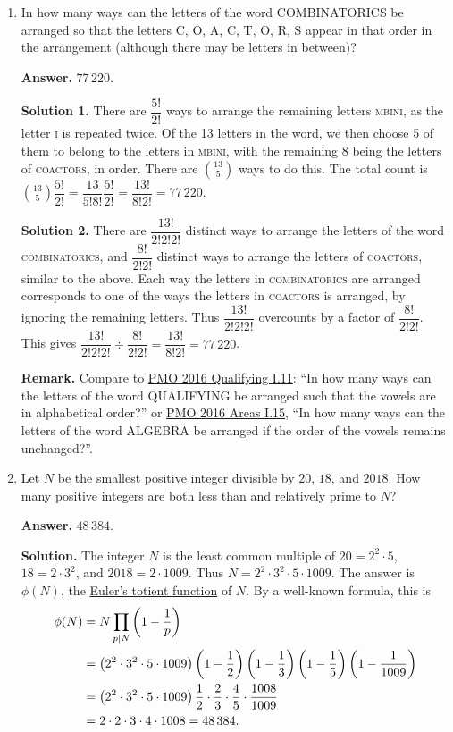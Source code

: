 \documentclass[11pt,paper=letter]{scrartcl}
\begin{document}
\begin{enumerate}[left=0pt]
\item In how many ways can the letters of the word COMBINATORICS be arranged so that the letters C, O, A, C, T, O, R, S appear in that order in the arrangement (although there may be letters in between)?

{\sffamily \bfseries Answer.} $\boxed{77\,220}$.

{\sffamily \bfseries Solution 1.} There are $\dfrac{5!}{2!}$ ways to arrange the remaining letters \textsc{mbini}, as the letter \textsc{i} is repeated twice. Of the 13 letters in the word, we then choose 5 of them to belong to the letters in \textsc{mbini}, with the remaining 8 being the letters of \textsc{coactors}, in order. There are $\displaystyle\binom{13}{5}$ ways to do this. The total count is $\displaystyle \binom{13}{5}\dfrac{5!}{2!} = \dfrac{13}{5!8!}\dfrac{5!}{2!} = \dfrac{13!}{8!2!} = 77\,220$.

{\sffamily \bfseries Solution 2.} There are $\dfrac{13!}{2!2!2!}$ distinct ways to arrange the letters of the word \textsc{combinatorics}, and $\dfrac{8!}{2!2!}$ distinct ways to arrange the letters of \textsc{coactors}, similar to the above. Each way the letters in \textsc{combinatorics} are arranged corresponds to one of the ways the letters in \textsc{coactors} is arranged, by ignoring the remaining letters. Thus $\dfrac{13!}{2!2!2!}$ overcounts by a factor of $\dfrac{8!}{2!2!}$. This gives ${\dfrac{13!}{2!2!2!}} \div {\dfrac{8!}{2!2!}} = \dfrac{13!}{8!2!} = 77\,220$.

{\small \sffamily \textbf{Remark.} Compare to \href{http://pmo.ph/wp-content/uploads/2015/10/18thPMO-QualifyingRound-Questions.pdf}{PMO 2016 Qualifying I.11}: ``In how many ways can the letters of the word QUALIFYING be arranged such that the vowels are in alphabetical order?'' or \href{http://pmo.ph/wp-content/uploads/2014/08/18th-PMO-Area-Stage.pdf}{PMO 2016 Areas I.15,} ``In how many ways can the letters of the word ALGEBRA be arranged if the order of the vowels remains unchanged?''.}

\item Let $N$ be the smallest positive integer divisible by $20$, $18$, and $2018$. How many positive integers are both less than and relatively prime to $N$?

{\sffamily \bfseries Answer.} $\boxed{48\,384}$.

{\sffamily \bfseries Solution.} The integer $N$ is the least common multiple of $20 = 2^2 \cdot 5$, $18 = 2 \cdot 3^2$, and $2018 = 2 \cdot 1009$. Thus $N = 2^2 \cdot 3^2 \cdot 5 \cdot 1009$. The answer is $\phi(N)$, the \href{https://en.wikipedia.org/wiki/Euler%27s_totient_function}{Euler's totient function} of $N$. By a well-known formula, this is \begin{align*}
\phi(N) &= N\prod_{p|N}\left( 1 - \frac1p \right) \\
&= \left( 2^2 \cdot 3^2 \cdot 5 \cdot 1009 \right)\left( 1 - \dfrac12 \right)\left( 1 - \frac13 \right)\left( 1 - \frac15 \right)\left( 1 - \frac1{1009} \right) \\
&= \left( 2^2 \cdot 3^2 \cdot 5 \cdot 1009 \right)\dfrac12 \cdot \dfrac23 \cdot \dfrac45 \cdot \dfrac{1008}{1009} \\
&= 2 \cdot 2 \cdot 3 \cdot 4 \cdot 1008 = 48\,384.\end{align*}


\end{enumerate}
\end{document}
